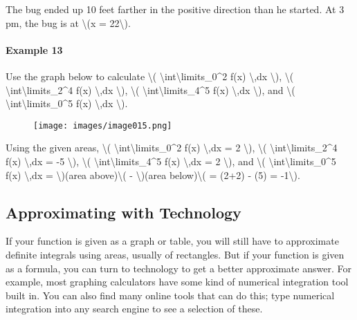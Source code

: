 The bug ended up 10 feet farther in the positive direction than he
started. At 3 pm, the bug is at \textbackslash{}(x =
22\textbackslash{}).

\hypertarget{example-13}{%
\paragraph{Example 13}\label{example-13}}

Use the graph below to calculate \textbackslash{}(
\textbackslash{}int\textbackslash{}limits\_0\^{}2 f(x)
\textbackslash{},dx \textbackslash{}), \textbackslash{}(
\textbackslash{}int\textbackslash{}limits\_2\^{}4 f(x)
\textbackslash{},dx \textbackslash{}), \textbackslash{}(
\textbackslash{}int\textbackslash{}limits\_4\^{}5 f(x)
\textbackslash{},dx \textbackslash{}), and \textbackslash{}(
\textbackslash{}int\textbackslash{}limits\_0\^{}5 f(x)
\textbackslash{},dx \textbackslash{}).

\begin{figure}
\centering
\texttt{[image: images/image015.png]}
\caption{}
\end{figure}

Using the given areas, \textbackslash{}(
\textbackslash{}int\textbackslash{}limits\_0\^{}2 f(x)
\textbackslash{},dx = 2 \textbackslash{}), \textbackslash{}(
\textbackslash{}int\textbackslash{}limits\_2\^{}4 f(x)
\textbackslash{},dx = -5 \textbackslash{}), \textbackslash{}(
\textbackslash{}int\textbackslash{}limits\_4\^{}5 f(x)
\textbackslash{},dx = 2 \textbackslash{}), and \textbackslash{}(
\textbackslash{}int\textbackslash{}limits\_0\^{}5 f(x)
\textbackslash{},dx = \textbackslash{})(area above)\textbackslash{}( -
\textbackslash{})(area below)\textbackslash{}( = (2+2) - (5) =
-1\textbackslash{}).

\hypertarget{approximating-with-technology}{%
\subsection{Approximating with
Technology}\label{approximating-with-technology}}

If your function is given as a graph or table, you will still have to
approximate definite integrals using areas, usually of rectangles. But
if your function is given as a formula, you can turn to technology to
get a better approximate answer. For example, most graphing calculators
have some kind of numerical integration tool built in. You can also find
many online tools that can do this; type numerical integration into any
search engine to see a selection of these.


